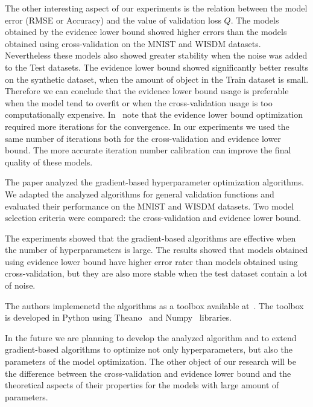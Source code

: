 The other interesting aspect of our experiments is the relation between the model error (RMSE or Accuracy) and the value of validation loss $Q$. The models obtained by the evidence lower bound showed higher errors than the models obtained using cross-validation on the MNIST and WISDM datasets. Nevertheless these models also showed greater stability when the noise was added to the Test datasets.  The evidence lower bound showed significantly better results on the synthetic dataset, when the amount of object in the Train dataset is small. Therefore we can conclude that the evidence lower bound usage is preferable when the model tend to overfit or when the cross-validation usage is too computationally expensive.   In~\cite{nips} note that the evidence lower bound optimization required more iterations for the convergence. In our experiments we used the same number of iterations both for the cross-validation and evidence lower bound. The more accurate iteration number calibration can improve the final quality of these models. 


The paper analyzed the gradient-based hyperparameter optimization algorithms. We adapted the analyzed algorithms for general validation functions and evaluated their performance on the  MNIST and WISDM datasets. Two model selection criteria were compared: the cross-validation and evidence lower bound. 

The experiments showed that the gradient-based algorithms are effective when the number of hyperparameters is large. The results showed that models obtained using evidence lower bound have higher error rater than models obtained using cross-validation, but they are also more stable when the test dataset contain a lot of noise. 

The authors  implemenetd the algorithms as a toolbox available at~\cite{pyfos}. The toolbox is developed in Python using Theano~\cite{theano} and Numpy~\cite{numpy} libraries. 

In the future we are planning to develop the analyzed algorithm and to extend gradient-based algorithms to optimize not only hyperparameters, but also the parameters of the model optimization. The other object of our research will be the difference between the cross-validation and evidence lower bound and the theoretical aspects of their properties for the models with large amount of parameters.

